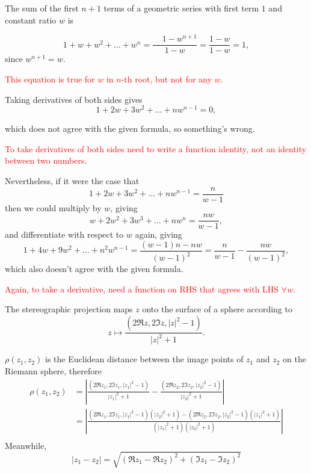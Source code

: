 \documentclass[12pt]{article}
\begin{document}
\begin{description}

  The sum of the first $n+1$ terms of a geometric series with first term $1$ and
  constant ratio $w$ is

  $$
  1 + w + w^2 + \ldots + w^{n} = \frac{~~~~~1 - w^{n+1}}{1 - w} = \frac{1 - w}{1 - w} = 1,
  $$
  since $w^{n+1} = w$.

  \textcolor{red}{This equation is true for $w$ in $n$-th root, but not for any $w$.}

  Taking derivatives of both sides gives
  $$
  1 + 2w + 3w^2 + \ldots + nw^{n-1} = 0,
  $$

  which does not agree with the given formula, so something's wrong.

  \textcolor{red}{To take derivatives of both sides need to write a function
    identity, not an identity between two numbers.}

  Nevertheless, if it were the case that
  $$
  1 + 2w + 3w^2 + \ldots + nw^{n-1} = \frac{n}{w -1}
  $$
  then we could multiply by $w$, giving
  $$
  w + 2w^2 + 3w^3 + \ldots + nw^n = \frac{nw}{w -1},
  $$
  and differentiate with respect to $w$ again, giving
  $$
  1 + 4w + 9w^2 + \ldots + n^2w^{n-1} = \frac{(w-1)n - nw}{(w - 1)^2} = \frac{n}{w - 1} - \frac{nw}{(w - 1)^2},
  $$
  which also doesn't agree with the given formula.

  \textcolor{red}{Again, to take a derivative, need a function on RHS that
    agrees with LHS $\forall w$.}



  The stereographic projection maps $z$ onto the surface of a sphere according to
  $$
  z \mapsto \frac{(2 \Re z, 2 \Im z, |z|^2 - 1)}{|z|^2 + 1}.
  $$


  $\rho(z_1, z_2)$
  is the Euclidean distance between the image points of $z_1$ and $z_2$ on the
  Riemann sphere, therefore
  \begin{align*}
  \rho(z_1, z_2)
  &=
  \left|
  \frac{(2 \Re z_1, 2 \Im z_1, |z_1|^2 - 1)}{|z_1|^2 + 1} -
  \frac{(2 \Re z_2, 2 \Im z_2, |z_2|^2 - 1)}{|z_2|^2 + 1}
  \right| \\
  &=
  \left|
  \frac{
  (2 \Re z_1, 2 \Im z_1, |z_1|^2 - 1)(|z_2|^2 + 1) -
  (2 \Re z_2, 2 \Im z_2, |z_2|^2 - 1)(|z_1|^2 + 1)
  }
  {(|z_1|^2 + 1)(|z_2|^2 + 1)}
  \right| \\
  \end{align*}
  Meanwhile,
  $$
  |z_1 - z_2| = \sqrt{(\Re z_1 - \Re z_2)^2 + (\Im z_1 - \Im z_2)^2}
  $$


\end{description}
\end{document}
